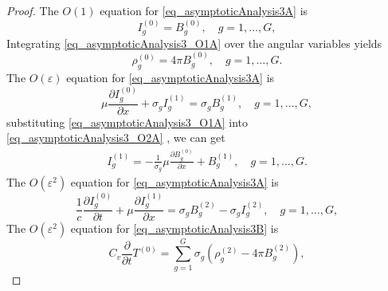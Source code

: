 \documentclass[preprint,12pt]{elsarticle}
\theoremstyle{definition}
\theoremstyle{plain}
\numberwithin{equation}{section}
\numberwithin{algorithm}{section}
\newcounter{eq_count}
\newcommand{\pdrv}[2]{\frac{\partial{#1}}{\partial{#2}}}
\begin{document}
\begin{proof}
   The $O(1)$ equation for \eqref{eq_asymptoticAnalysis3A} is
    \begin{equation}\label{eq_asymptoticAnalysis3_O1A}
        I_g^{(0)} = B_g^{(0)},  \quad g=1,\ldots,G, 
    \end{equation}
    Integrating \eqref{eq_asymptoticAnalysis3_O1A} over the angular variables yields 
      \begin{equation}\label{eq_asymptoticAnalysis3_O1B}
        \rho_g^{(0)} =  4 \pi B_g^{(0)},  \quad g=1,\ldots,G. 
    \end{equation}
    The $O(\varepsilon)$ equation for \eqref{eq_asymptoticAnalysis3A} is
    \begin{equation}\label{eq_asymptoticAnalysis3_O2A}
        \mu \pdrv{I_g^{(0)}}{x}  + \sigma_{g}I_g^{(1)} = \sigma_{g} B_g^{(1)} ,  \quad g=1,\ldots,G, 
    \end{equation}
    substituting \eqref{eq_asymptoticAnalysis3_O1A} into \eqref{eq_asymptoticAnalysis3_O2A} , we can get
    \begin{equation} \label{eq_asymptoticAnalysis3_O2B}
        \begin{aligned}
                I_g^{(1)} = - \frac{1}{ \sigma_g} \mu \pdrv{B_g^{(0)}}{x}+  B_g^{(1)} ,  \quad g=1,\ldots,G. 
        \end{aligned}
    \end{equation}
    The $O(\varepsilon^2)$ equation for \eqref{eq_asymptoticAnalysis3A} is
    \begin{equation}\label{eq_asymptoticAnalysis3_O3A}
        \frac{1}{c} \frac{\partial I_g^{(0)}}{\partial t}+\mu \pdrv{I_g^{(1)}}{x}  = \sigma_{g} B_g^{(2)}-\sigma_{g}I_g^{(2)},  \quad g=1,\ldots,G, 
    \end{equation}
       The $O(\varepsilon^2)$ equation for \eqref{eq_asymptoticAnalysis3B} is
        \begin{equation}\label{eq_asymptoticAnalysis3_O3B}
        C_v \frac{\partial }{\partial t} T^{(0)} =\sum_{g=1}^{G} \sigma_{g} \left( \rho_g^{(2)}- 4 \pi B_g^{(2)}  \right), 
    \end{equation}


\end{proof}
\end{document}
